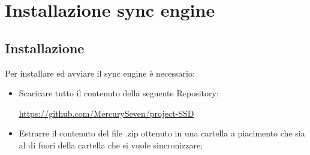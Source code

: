 \section{Installazione sync engine}

\subsection{Installazione}
Per installare ed avviare il sync engine è necessario:
\begin{itemize}
	\item Scaricare tutto il contenuto della seguente Repository:
	
\centerline{\url{https://github.com/MercurySeven/project-SSD}}

	\item Estrarre il contenuto del file .zip ottenuto in una cartella a piacimento che sia al di fuori della cartella che si vuole sincronizzare;
	
\end{itemize}
\subsubsection{}

\subsubsection{}

\subsubsection{}

